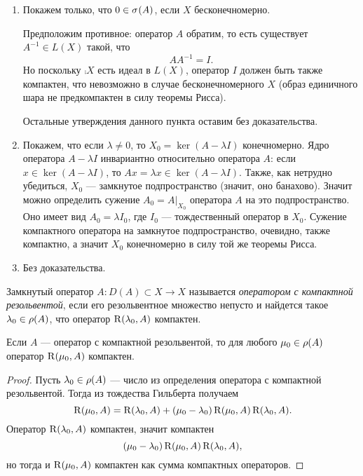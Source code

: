 \begin{proofbreak}
    \begin{enumerate}
        \item  Покажем только, что $0 \in \spectrum{A}$, если $X$ бесконечномерно. 

        Предположим противное:     оператор $A$ обратим, то есть существует $A^{-1} \in L(X)$ такой, что
        \[ AA^{-1} = I. \]
        Но поскольку $\comp{X}$ есть идеал в $L(X)$, оператор $I$ должен быть также компактен, что
        невозможно в случае бесконечномерного $X$ (образ единичного шара не предкомпактен в силу 
        теоремы Рисса).

        Остальные утверждения данного пункта оставим без доказательства.

        \item Покажем, что если $\lambda \neq 0$, то $X_0 = \ker(A - \lambda I)$ конечномерно.
        Ядро оператора $A - \lambda I$ инвариантно относительно оператора $A$: если 
        $x \in \ker (A - \lambda I)$, то $Ax = \lambda x \in \ker (A - \lambda I)$.
        Также, как нетрудно убедиться, $X_0$ --- замкнутое подпространство (значит, оно банахово).
        Значит можно определить сужение $A_0 = A|_{X_0}$ оператора $A$ на это подпространство.
        Оно имеет вид $A_0 = \lambda I_{0}$, где $I_0$ --- тождественный оператор в $X_0$. 
        Сужение компактного оператора на замкнутое подпространство, очевидно, также
        компактно, а значит $X_0$ конечномерно в силу той же теоремы Рисса.

        \item Без доказательства.
    \end{enumerate}
\end{proofbreak}

\begin{definition}
    Замкнутый оператор $A \colon D(A) \subset X \to X$ называется \emph{оператором с компактной 
    резольвентой}, если его резольвентное множество непусто и найдется такое 
    $\lambda_0 \in \operatorname{\rho}(A)$, что оператор $\operatorname{R}(\lambda_0, A)$ компактен.
\end{definition}

\begin{lemma}
    Если $A$ --- оператор с компактной резольвентой, то для любого $\mu_0 \in \operatorname{\rho}(A)$ оператор
    $\operatorname{R}(\mu_0, A)$ компактен.
\end{lemma}

\begin{proof}
    Пусть $\lambda_0 \in \operatorname{\rho}(A)$ --- число из определения оператора с компактной резольвентой.
    Тогда из тождества Гильберта получаем
    \[ \operatorname{R}(\mu_0, A) = \operatorname{R}(\lambda_0, A) + (\mu_0 - \lambda_0)\operatorname{R}(\mu_0, A)
        \operatorname{R}(\lambda_0, A). \]
    Оператор $\operatorname{R}(\lambda_0, A)$ компактен, значит компактен
    \[(\mu_0 - \lambda_0)\operatorname{R}(\mu_0, A)\operatorname{R}(\lambda_0, A),\]
    но тогда и $\operatorname{R}(\mu_0, A)$ компактен как сумма компактных операторов.
\end{proof}

